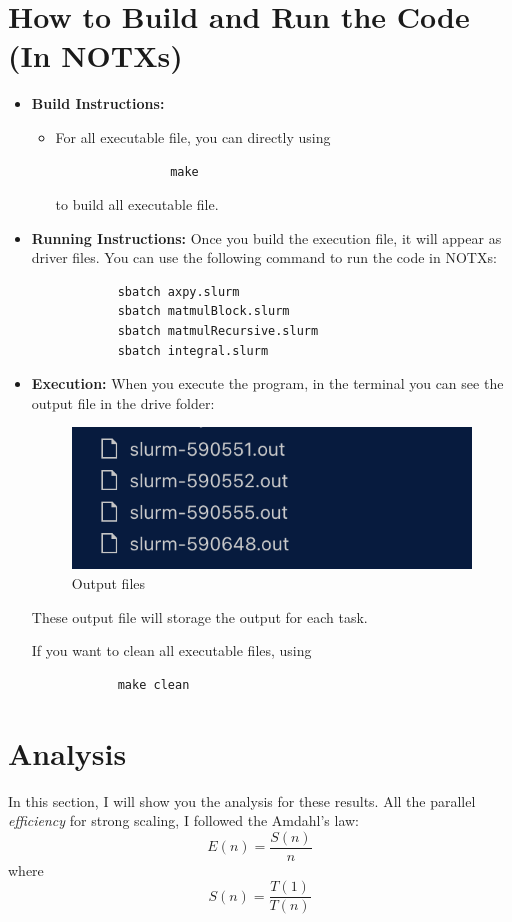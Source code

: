 \documentclass[11pt]{article}
\begin{document}
\section{How to Build and Run the Code (In NOTXs)}
\label{sec:build_run}
\begin{itemize}
    \item \textbf{Build Instructions:} 
        \begin{itemize}
            \item For all executable file, you can directly using
            \begin{verbatim}
                make
            \end{verbatim}
            to build all executable file.
            
        \end{itemize}
    \item \textbf{Running Instructions:} 
        Once you build the execution file, it will appear as driver files. You can use the following command to run the code in NOTXs:
        \begin{verbatim}
            sbatch axpy.slurm
            sbatch matmulBlock.slurm
            sbatch matmulRecursive.slurm
            sbatch integral.slurm
        \end{verbatim}
    \item  \textbf{Execution: }
        When you execute the program, in the terminal you can see the output file in the drive folder:
        \begin{figure}[H]
            \centering
            \includegraphics[width=0.5\linewidth]{Assignments/HW2/docs/images/output_files.png}
            \caption{Output files}
            \label{fig:Output files}
        \end{figure}
        These output file will storage the output for each task.

        If you want to clean all executable files, using
        \begin{verbatim}
            make clean
        \end{verbatim}
\end{itemize}

\newpage

\section{Analysis}
In this section, I will show you the analysis for these results. All the parallel \textit{efficiency} for strong scaling, I followed the Amdahl's law:
\begin{equation*}
    E(n) = \frac{S(n)}{n}
\end{equation*}
where 
\begin{equation*}
    S(n) = \frac{T(1)}{T(n)}
\end{equation*}
\end{document}
